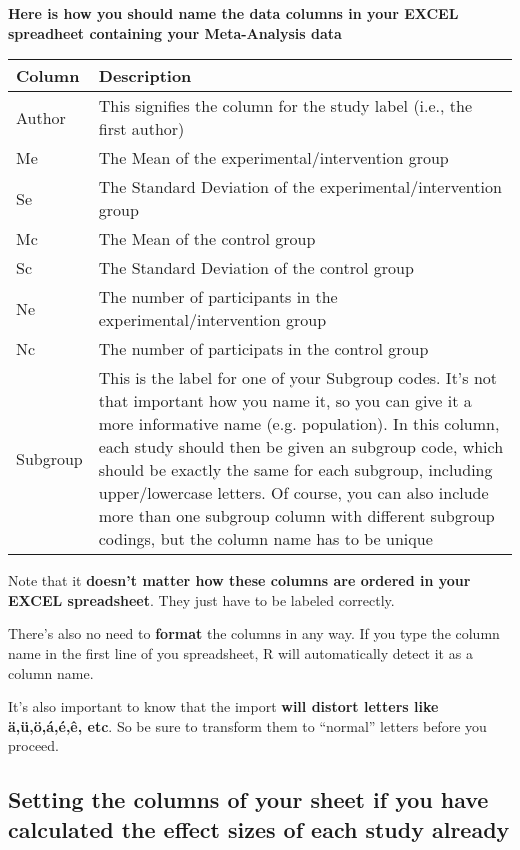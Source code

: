 \documentclass[]{book}
\theoremstyle{definition}
\theoremstyle{definition}
\theoremstyle{definition}
\theoremstyle{remark}
\begin{document}
\textbf{Here is how you should name the data columns in your EXCEL
spreadheet containing your Meta-Analysis data}

\begin{tabular}{l|l}
\hline
Column & Description\\
\hline
Author & This signifies the column for the study label (i.e., the first author)\\
\hline
Me & The Mean of the experimental/intervention group\\
\hline
Se & The Standard Deviation of the experimental/intervention group\\
\hline
Mc & The Mean of the control group\\
\hline
Sc & The Standard Deviation of the control group\\
\hline
Ne & The number of participants in the experimental/intervention group\\
\hline
Nc & The number of participats in the control group\\
\hline
Subgroup & This is the label for one of your Subgroup codes. It's not that important how you name it, so you can give it a more informative name (e.g. population). In this column, each study should then be given an subgroup code, which should be exactly the same for each subgroup, including upper/lowercase letters. Of course, you can also include more than one subgroup column with different subgroup codings, but the column name has to be unique\\
\hline
\end{tabular}

Note that it \textbf{doesn't matter how these columns are ordered in
your EXCEL spreadsheet}. They just have to be labeled correctly.

There's also no need to \textbf{format} the columns in any way. If you
type the column name in the first line of you spreadsheet, R will
automatically detect it as a column name.

\begin{rmdachtung}
It's also important to know that the import \textbf{will distort letters
like ä,ü,ö,á,é,ê, etc}. So be sure to transform them to ``normal''
letters before you proceed.
\end{rmdachtung}

\subsection{Setting the columns of your sheet if you have calculated the
effect sizes of each study
already}\label{setting-the-columns-of-your-sheet-if-you-have-calculated-the-effect-sizes-of-each-study-already}
\end{document}
